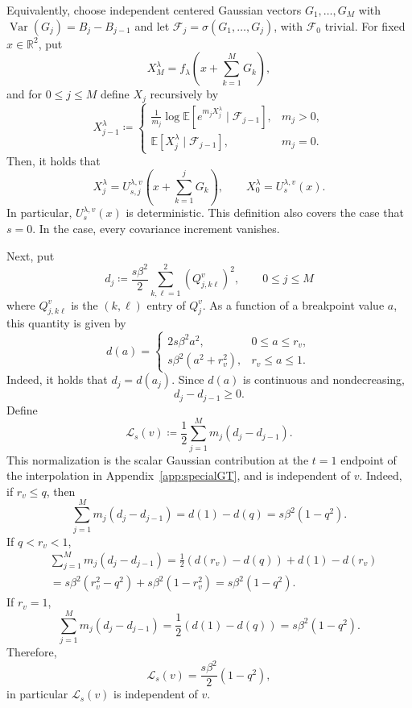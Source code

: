 \documentclass[11pt]{article}
\numberwithin{equation}{section}
\newcommand{\E}{\mathbb{E}}
\newcommand{\1}{\mathbf 1}
\newcommand{\Var}{\operatorname{Var}}
\begin{document}
Equivalently, choose independent centered Gaussian vectors
$G_1,\ldots,G_M$ with $\Var(G_j)=B_j-B_{j-1}$ and let
$\mathcal F_j=\sigma(G_1,\ldots,G_j)$, with $\mathcal F_0$ trivial.
For fixed $x\in\mathbb R^2$, put
\[
 X_M^\lambda=f_\lambda\left(x+\sum_{k=1}^MG_k\right) ,
\]
and for $0\le j \le M$ define $X_j$ recursively by
\begin{equation}
 X_{j-1}^\lambda \coloneqq
 \begin{cases}
 \displaystyle\frac1{m_j}\log\E\left[
 e^{m_jX_j^\lambda}\mid\mathcal F_{j-1}\right],&m_j>0,\\[3mm]
 \displaystyle\E\left[X_j^\lambda\mid\mathcal F_{j-1}\right],&m_j=0.
 \end{cases}
 \label{eq:U-conditional-recursion}
\end{equation}
Then, it holds that
\begin{equation}\label{eq:relationXU}
 X_j^\lambda=U_{s,j}^{\lambda,v}
 \left(x+\sum_{k=1}^jG_k\right),
 \qquad
 X_0^\lambda = U_s^{\lambda,v}(x).
\end{equation}
In particular, $U_s^{\lambda,v}(x)$ is deterministic.  This definition
also covers the case that $s=0$.
In the case, every covariance increment vanishes.

Next, put
\begin{equation}
 d_j\coloneqq\frac{s\beta^2}{2}
 \sum_{k,\ell =1}^2(Q_{j,k\ell}^v)^2,
 \qquad 0\le j\le M
\end{equation}
where $Q_{j,k\ell}^v$ is the $(k,\ell)$ entry of $Q_{j}^v$.
As a function of a breakpoint value $a$, this quantity is given by
\[
 d(a)=
 \begin{cases}
 2s\beta^2a^2,&0\le a\le r_v,\\[1mm]
 s\beta^2(a^2+r_v^2),&r_v\le a\le1.
 \end{cases}
\]
Indeed, it holds that $d_j = d(a_j)$.
Since $d(a)$ is continuous and nondecreasing, 
\begin{equation}\label{eq:finite-step-scalar-increments}
d_j-d_{j-1}\ge0.
\end{equation}
Define
\begin{equation}\label{eq:defLv}
 \mathcal L_s(v)\coloneqq
 \frac12\sum_{j=1}^Mm_j(d_j-d_{j-1}).
\end{equation}
This normalization is the scalar Gaussian contribution at the
$t=1$ endpoint of the interpolation in Appendix~\ref{app:specialGT}, and is independent of $v$.  Indeed, if $r_v\le q$, then
\[
\sum_{j=1}^Mm_j(d_j-d_{j-1}) = d(1)-d(q)=s\beta^2(1-q^2).
\]
If $q<r_v < 1$,
\begin{align*}
&\sum_{j=1}^Mm_j(d_j-d_{j-1})
 =\frac12(d(r_v)-d(q))+d(1)-d(r_v) \\
& =s\beta^2(r_v^2-q^2)+s\beta^2(1-r_v^2)
 =s\beta^2(1-q^2).
\end{align*}
If $r_v=1$,
\[
 \sum_{j=1}^M m_j(d_j-d_{j-1}) = \frac12(d(1)-d(q))=s\beta^2(1-q^2).
\]
Therefore,
\begin{equation}
 \mathcal L_s(v)=\frac{s\beta^2}{2}(1-q^2),
 \label{eq:GTcorrection}
\end{equation}
in particular $\mathcal L_s(v)$ is independent of $v$.
\end{document}
